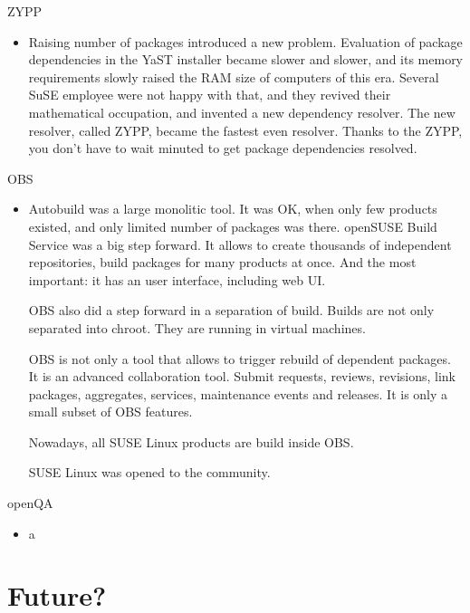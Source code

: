\documentclass{beamer}
\begin{document}
\begin{frame}[t]{ZYPP}
        \begin{itemize}
        \item Raising number of packages introduced a new problem. Evaluation of package dependencies in the YaST installer became slower and slower, and its memory requirements slowly raised the RAM size of computers of this era. Several SuSE employee were not happy with that, and they revived their mathematical occupation, and invented a new dependency resolver. The new resolver, called ZYPP, became the fastest even resolver. Thanks to the ZYPP, you don't have to wait minuted to get package dependencies resolved.
        \end{itemize}
\end{frame}

\begin{frame}[t]{OBS}
	\begin{itemize}
	\item Autobuild was a large monolitic tool. It was OK, when only few products existed, and only limited number of packages was there. openSUSE Build Service was a big step forward. It allows to create thousands of independent repositories, build packages for many products at once. And the most important: it has an user interface, including web UI.
	
	OBS also did a step forward in a separation of build. Builds are not only separated into chroot. They are running in virtual machines.
	
	OBS is not only a tool that allows to trigger rebuild of dependent packages. It is an advanced collaboration tool. Submit requests, reviews, revisions, link packages, aggregates, services, maintenance events and releases. It is only a small subset of OBS features.
	
	Nowadays, all SUSE Linux products are build inside OBS.
	
	SUSE Linux was opened to the community.
	\end{itemize}
\end{frame}

\begin{frame}[t]{openQA}
	\begin{itemize}
	\item a
	\end{itemize}
\end{frame}

\section{Future?}
\end{document}
